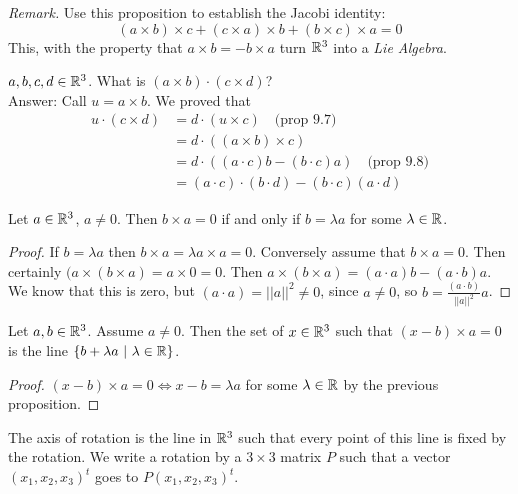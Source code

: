 \documentclass[10pt]{scrartcl}
\begin{document}
\emph{Remark.} Use this proposition to establish the Jacobi identity:
\[
  (a \times b) \times c + (c \times a)\times b + (b \times c) \times a = 0
\]
This, with the property that $a \times b = - b \times a$ turn $\mathbb{R}^3$ into a \emph{Lie Algebra}.\\

\begin{example}
$a,b,c,d \in\mathbb{R}^3$. What is $(a \times b)\cdot(c \times d)$?\\

Answer: Call $u = a \times b$. We proved that
 \begin{align*}
   u \cdot(c \times d) &= d\cdot(u \times c)\quad \text{(prop 9.7)}\\
   &= d\cdot((a \times b) \times c) \\
   &= d\cdot((a\cdot c)b - (b\cdot c)a)\quad \text{(prop 9.8)} \\
   &= (a\cdot c) \cdot(b\cdot d) - (b\cdot c)(a\cdot d)
\end{align*}
\end{example}\vsp


\begin{proposition}
Let $a \in\mathbb{R}^3$, $a \neq 0$. Then $b \times a= 0$ if and only if $b = \lambda a$ for some $\lambda \in\mathbb{R}$. 	
\end{proposition}

\begin{proof}
If $b = \lambda a$ then $b \times a = \lambda a \times a =0$. Conversely assume that $b \times a= 0$. Then certainly $(a \times (b \times a) = a \times 0 = 0$. Then $a \times(b \times a) = (a\cdot a)b - (a\cdot b)a$. We know that this is zero, but $(a\cdot a) = ||a||^2 \neq 0$, since $a \neq 0$, so $b = \frac{(a\cdot b)}{||a||^2}a$.	
\end{proof}\vsp


\begin{proposition}
Let $a,b\in\mathbb{R}^3$. Assume $a \neq 0$. Then the set of $x \in\mathbb{R}^3$ such that $(x-b) \times a = 0$ is the line $\{b + \lambda a ~|~ \lambda \in\mathbb{R}\}$.	
\end{proposition}


\begin{proof}
$(x-b) \times a = 0 \iff x -b = \lambda a$ for some $\lambda \in\mathbb{R}$ by the previous proposition.	
\end{proof}



The axis of rotation is the line in $\mathbb{R}^3$ such that every point of this line is fixed by the rotation. We write a rotation by a $3 \times 3$ matrix $P$ such that a vector $(x_1,x_2,x_3)^t$ goes to $P(x_1,x_2,x_3)^t$. 
\end{document}
